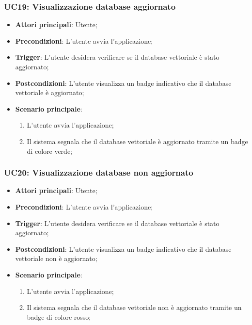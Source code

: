 \hypertarget{UC19}{}
\subsubsection{UC19: Visualizzazione database aggiornato}
\begin{itemize}
    \item \textbf{Attori principali}: Utente;
    \item \textbf{Precondizioni}: L'utente avvia l'applicazione;
    \item \textbf{Trigger}: L'utente desidera verificare se il database vettoriale è stato aggiornato;
    \item \textbf{Postcondizioni}: L'utente visualizza un badge indicativo che il database vettoriale è aggiornato;
    \item \textbf{Scenario principale}:
    \begin{enumerate}
        \item L'utente avvia l'applicazione;
        \item Il sistema segnala che il database vettoriale è aggiornato tramite un badge di colore verde;
    \end{enumerate}
\end{itemize}

\hypertarget{UC20}{}
\subsubsection{UC20: Visualizzazione database non aggiornato}
\begin{itemize}
    \item \textbf{Attori principali}: Utente;
    \item \textbf{Precondizioni}: L'utente avvia l'applicazione;
    \item \textbf{Trigger}: L'utente desidera verificare se il database vettoriale è stato aggiornato;
    \item \textbf{Postcondizioni}: L'utente visualizza un badge indicativo che il database vettoriale non è aggiornato;
    \item \textbf{Scenario principale}:
    \begin{enumerate}
        \item L'utente avvia l'applicazione;
        \item Il sistema segnala che il database vettoriale non è aggiornato tramite un badge di colore rosso;
    \end{enumerate}
\end{itemize}

